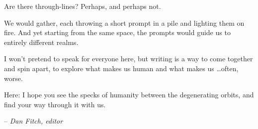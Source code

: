 Are there through-lines? Perhaps, and perhaps not.

We would gather, each throwing a short prompt in a pile and lighting them on fire. And yet starting from the same space, the prompts would guide us to entirely different realms.

I won't pretend to speak for everyone here, but writing is a way to come together and spin apart, to explore what makes us human and what makes us \ldots often, worse.

Here: I hope you see the specks of humanity between the degenerating orbits, and find your way through it with us.

\vspace{1em}

\hfill-- \emph{Dan Fitch, editor}


\clearpage


\specsep{}

\clearpage

\specsep{}

\specsep{}


\specsep{}

\clearpage

\specsep{}

\specsep{}

\specsep{}

\specsep{}

\clearpage

\clearpage

\clearpage

\clearpage

\specsep{}

\specsep{}

\clearpage

\clearpage

\specsep{}

\specsep{}

\specsep{}

\clearpage


\clearpage

\specsep{}

\clearpage

\specsep{}

\clearpage

